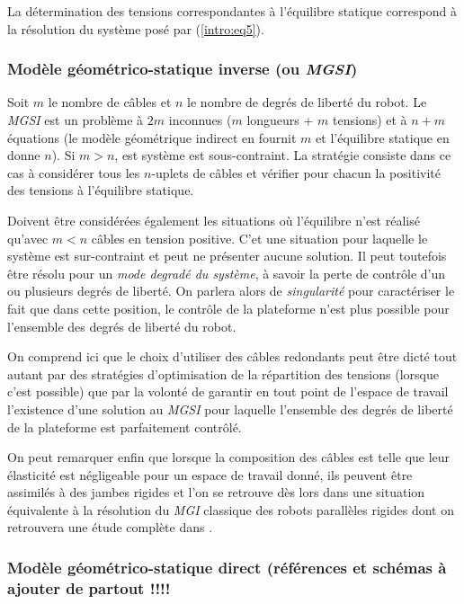 La détermination des tensions correspondantes à l'équilibre statique correspond à la résolution du système posé par (\ref{intro:eq5}).

\subsubsection{Modèle géométrico-statique inverse (ou {\it MGSI})}

Soit $m$ le nombre de câbles et $n$ le nombre de degrés de liberté du robot. Le {\it MGSI} est un problème à $2m$ inconnues ($m$ longueurs + $m$ tensions) et à $n+m$ équations (le modèle géométrique indirect en fournit $m$ et l'équilibre statique en donne $n$). Si $m > n$, est système est sous-contraint. La stratégie consiste dans ce cas à considérer tous les $n$-uplets de câbles et vérifier pour chacun la positivité des tensions à l'équilibre statique.

Doivent être considérées également les situations où l'équilibre n'est réalisé qu'avec $m < n$ câbles en tension positive. C'et une situation pour laquelle le système est sur-contraint et peut ne présenter aucune solution. Il peut toutefois être résolu pour un {\it mode degradé du système}, à savoir la perte de contrôle d'un ou plusieurs degrés de liberté. On parlera alors de {\it singularité} pour caractériser le fait que dans cette position, le contrôle de la plateforme n'est plus possible pour l'ensemble des degrés de liberté du robot.

On comprend ici que le choix d'utiliser des câbles redondants peut être dicté tout autant par des stratégies d'optimisation de la répartition des tensions (lorsque c'est possible) que par la volonté de garantir en tout point de l'espace de travail l'existence d'une solution au {\it MGSI} pour laquelle l'ensemble des degrés de liberté de la plateforme est parfaitement contrôlé.

On peut remarquer enfin que lorsque la composition des câbles est telle que leur élasticité est négligeable pour un espace de travail donné, ils peuvent être assimilés à des jambes rigides et l'on se retrouve dès lors dans une situation équivalente à la résolution du {\it MGI} classique des robots parallèles rigides dont on retrouvera une étude complète dans \cite{merlet1997robots}.

\subsubsection{Modèle géométrico-statique direct (références et schémas à ajouter de partout !!!!}

